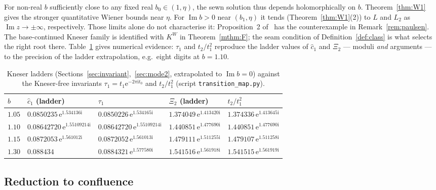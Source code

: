 \documentclass[11pt]{amsart}
\theoremstyle{definition}
\newcommand{\Kk}{K}
\newcommand{\eee}{\mathrm{e}}
\newcommand{\ii}{\mathrm{i}}
\begin{document}
For non-real $b$ sufficiently close to any fixed real $b_0\in(1,\eta)$,
the sewn solution thus depends holomorphically on $b$.
Theorem~\ref{thm:W1} gives the stronger quantitative Wiener bounds near
$\eta$.  For $\operatorname{Im}b>0$ near $(b_1,\eta)$ it tends (Theorem~\ref{thm:W1}(2)) to $L$ and $L_2$ as
$\operatorname{Im}z\to\pm\infty$, respectively.  Those limits alone do not characterise
it: Proposition~2 of~\cite{Paulsen2019} has the counterexample in
Remark~\ref{rem:paulsen}.  The base-continued Kneser family is identified with $\Kk^W$ in
Theorem~\ref{mthm:F}; the seam condition of Definition~\ref{def:class} is what
selects the right root there.  Table~\ref{tab:tau} gives numerical evidence:
$\tau_1$ and $t_2/t_1^2$ reproduce the ladder values of $\hat c_1$ and
$\Xi_2$ --- moduli \emph{and} arguments --- to the precision of the
ladder extrapolation, e.g.\ eight digits at $b=1.10$.

\begin{table}[htbp]
\centering
\caption{Kneser ladders (Sections~\ref{sec:invariant},~\ref{sec:mode2}, extrapolated
to $\operatorname{Im}b=0$) against the Kneser-free invariants
$\tau_1=t_1\eee^{-2\pi\ii t_0}$ and $t_2/t_1^2$ (script \texttt{transition\_map.py}).}
\label{tab:tau}
\small\setlength{\tabcolsep}{3.5pt}
\begin{tabular}{lllll}
\toprule
$b$ & $\hat c_1$ (ladder) & $\tau_1$ & $\Xi_2$ (ladder) & $t_2/t_1^2$\\
\midrule
$1.05$ & $0.0850235\,\eee^{1.534136\ii}$ & $0.0850226\,\eee^{1.534165\ii}$ & $1.374049\,\eee^{1.413420\ii}$ & $1.374336\,\eee^{1.413645\ii}$\\
$1.10$ & $0.08642720\,\eee^{1.55109214\ii}$ & $0.08642720\,\eee^{1.55109214\ii}$ & $1.440851\,\eee^{1.477690\ii}$ & $1.440851\,\eee^{1.477690\ii}$\\
$1.15$ & $0.0872053\,\eee^{1.561012\ii}$ & $0.0872052\,\eee^{1.561013\ii}$ & $1.479111\,\eee^{1.511255\ii}$ & $1.479107\,\eee^{1.511258\ii}$\\
$1.30$ & $0.088434$ & $0.0884321\,\eee^{1.577580\ii}$ & $1.541516\,\eee^{1.561918\ii}$ & $1.541515\,\eee^{1.561919\ii}$\\
\bottomrule
\end{tabular}
\end{table}

\subsection{Reduction to confluence}
\end{document}
